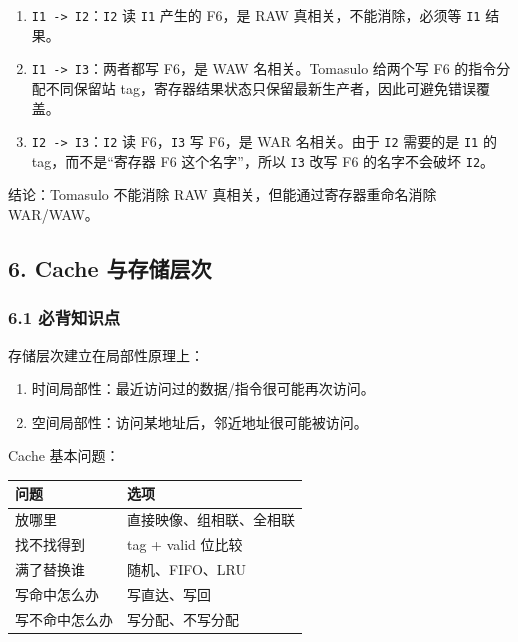 \documentclass[
]{ctexart}
\newcommand{\passthrough}[1]{#1}
\newcounter{none} %
\providecommand{\tightlist}{%
  \setlength{\itemsep}{0pt}\setlength{\parskip}{0pt}}
\begin{document}
\begin{enumerate}
\def\labelenumi{\arabic{enumi}.}
\tightlist
\item
  \passthrough{\lstinline!I1 -> I2!}：\passthrough{\lstinline!I2!} 读
  \passthrough{\lstinline!I1!} 产生的 F6，是 RAW
  真相关，不能消除，必须等 \passthrough{\lstinline!I1!} 结果。
\item
  \passthrough{\lstinline!I1 -> I3!}：两者都写 F6，是 WAW
  名相关。Tomasulo 给两个写 F6 的指令分配不同保留站
  tag，寄存器结果状态只保留最新生产者，因此可避免错误覆盖。
\item
  \passthrough{\lstinline!I2 -> I3!}：\passthrough{\lstinline!I2!} 读
  F6，\passthrough{\lstinline!I3!} 写 F6，是 WAR 名相关。由于
  \passthrough{\lstinline!I2!} 需要的是 \passthrough{\lstinline!I1!} 的
  tag，而不是``寄存器 F6 这个名字''，所以 \passthrough{\lstinline!I3!}
  改写 F6 的名字不会破坏 \passthrough{\lstinline!I2!}。
\end{enumerate}

结论：Tomasulo 不能消除 RAW 真相关，但能通过寄存器重命名消除 WAR/WAW。

\subsection{6. Cache
与存储层次}\label{cache-ux4e0eux5b58ux50a8ux5c42ux6b21}

\subsubsection{6.1 必背知识点}\label{ux5fc5ux80ccux77e5ux8bc6ux70b9-5}

存储层次建立在局部性原理上：

\begin{enumerate}
\def\labelenumi{\arabic{enumi}.}
\tightlist
\item
  时间局部性：最近访问过的数据/指令很可能再次访问。
\item
  空间局部性：访问某地址后，邻近地址很可能被访问。
\end{enumerate}

Cache 基本问题：

{\def\LTcaptype{none} %
\begin{longtable}[]{@{}ll@{}}
\toprule\noalign{}
问题 & 选项 \\
\midrule\noalign{}
\endhead
\bottomrule\noalign{}
\endlastfoot
放哪里 & 直接映像、组相联、全相联 \\
找不找得到 & tag + valid 位比较 \\
满了替换谁 & 随机、FIFO、LRU \\
写命中怎么办 & 写直达、写回 \\
写不命中怎么办 & 写分配、不写分配 \\
\end{longtable}
}
\end{document}
